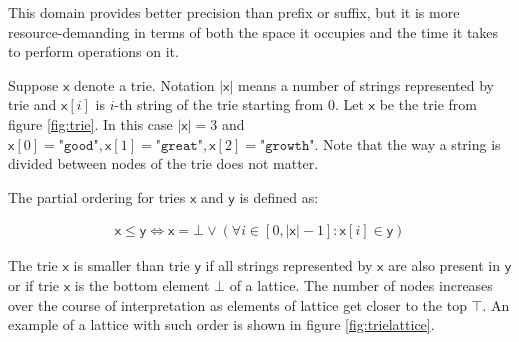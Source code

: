 \documentclass[12pt,final,oneside]{fithesis2}
\theoremstyle{definition}
\begin{document}
This domain provides better precision than prefix or suffix, but it is more
resource-demanding in terms of both the space it occupies and the time it
takes to perform operations on it.

Suppose $\mathsf{x}$ denote a trie. Notation $|\mathsf{x}|$ means a number of
strings represented by trie and $\mathsf{x}[i]$ is $i$-th string of the trie
starting from 0. Let $\mathsf{x}$ be the trie from figure \ref{fig:trie}.
In this case $|\mathsf{x}| = 3$ and $\mathsf{x}[0] = \texttt{"good"},
\mathsf{x}[1] = \texttt{"great"}, \mathsf{x}[2] = \texttt{"growth"}$.
Note that the way a string is divided between nodes of the trie does not
matter. 

The partial ordering for tries $\mathsf{x}$ and $\mathsf{y}$ is defined as:

\begin{align*}
\mathsf{x} \leq \mathsf{y} \Leftrightarrow
  \mathsf{x} = \bot \lor (\forall i \in [0, |\mathsf{x}| - 1] : \mathsf{x}[i] \in \mathsf{y})
\end{align*}

The trie $\mathsf{x}$ is smaller than trie $\mathsf{y}$ if all strings
represented by $\mathsf{x}$ are also present in $\mathsf{y}$ or if trie
$\mathsf{x}$ is the bottom element $\bot$ of a lattice. The number of nodes
increases over the course of interpretation as elements of lattice get
closer to the top $\top$. An example of a lattice with such order is shown
in figure \ref{fig:trielattice}.
\end{document}
